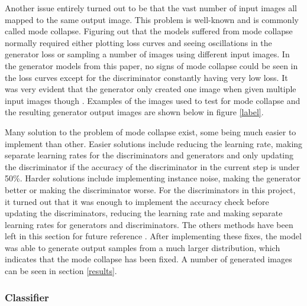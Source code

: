\documentclass[12pt, fleqn, titlepage]{article}
\begin{document}
Another issue entirely turned out to be that the vast number of input images all mapped to the same output image. This problem is well-known and is commonly called mode collapse. Figuring out that the models suffered from mode collapse normally required either plotting loss curves and seeing oscillations in the generator loss or sampling a number of images using different input images. In the generator models from this paper, no signs of mode collapse could be seen in the loss curves except for the discriminator constantly having very low loss. It was very evident that the generator only created one image when given multiple input images though \cite{mode_collapse_MLM}. Examples of the images used to test for mode collapse and the resulting generator output images are shown below in figure \ref{label}.

%	
Many solution to the problem of mode collapse exist, some being much easier to implement than other. Easier solutions include reducing the learning rate, making separate learning rates for the discriminators and generators and only updating the discriminator if the accuracy of the discriminator in the current step is under 50\%. Harder solutions include implementing instance noise, making the generator better or making the discriminator worse. For the discriminators in this project, it turned out that it was enough to implement the accuracy check before updating the discriminators, reducing the learning rate and making separate learning rates for generators and discriminators. The others methods have been left in this section for future reference \cite{mode_collapse_reddit_fix}\cite{mode_collapse_github}. After implementing these fixes, the model was able to generate output samples from a much larger distribution, which indicates that the mode collapse has been fixed. A number of generated images can be seen in section \ref{results}.

\subsubsection{Classifier}
\end{document}
